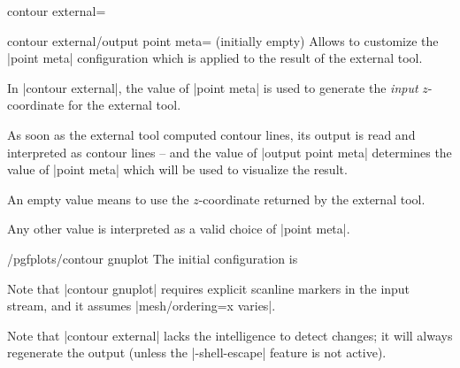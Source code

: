 {{\begin{plottype}[/pgfplots]{
    contour external=\textcolor{black}{}%
}
    \begin{pgfplotskey}{contour external/output point meta= (initially empty)}
        Allows to customize the |point meta| configuration which is applied to
        the result of the external tool.

        In |contour external|, the value of |point meta| is used to generate
        the \emph{input} $z$-coordinate for the external tool.

        As soon as the external tool computed contour lines, its output is read
        and interpreted as contour lines -- and the value of
        |output point meta| determines the value of |point meta| which will be
        used to visualize the result.

        An empty value means to use the $z$-coordinate returned by the external
        tool.

        Any other value is interpreted as a valid choice of |point meta|.
    \end{pgfplotskey}

    \begin{stylekey}{/pgfplots/contour gnuplot}
    \label{key:pgfplots:contour:gnuplot}
        The initial configuration is
\begin{codeexample}
\end{codeexample}
        Note that |contour gnuplot| requires explicit scanline markers in the
        input stream, and it assumes |mesh/ordering=x varies|.
    \end{stylekey}

    Note that |contour external| lacks the intelligence to detect changes; it
    will always regenerate the output (unless the |-shell-escape| feature is
    not active).
\end{plottype}

}}
